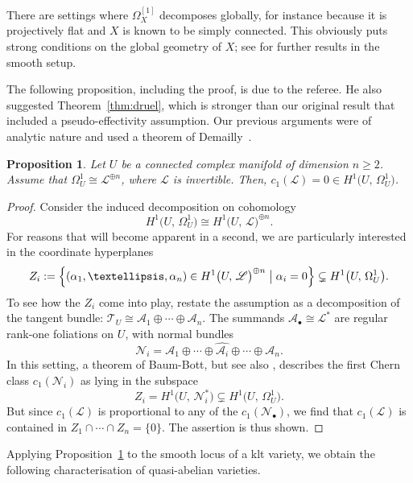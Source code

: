 \documentclass[11pt]{article}
\let\scr\mathscr
\newcommand{\sbullet}{{\scriptscriptstyle\bullet}}
\theoremstyle{plain}
\newtheorem{prop}[thm]{Proposition}
\theoremstyle{definition}
\numberwithin{equation}{thm}
\numberwithin{enumi}{thm}
\newcommand{\sA}{\scr{A}}
\newcommand{\sL}{\scr{L}}
\newcommand{\sN}{\scr{N}}
\newcommand{\sT}{\scr{T}}
\let\what\widehat
\begin{document}
There are settings where $\Omega^{[1]}_X$ decomposes globally, for instance because
it is projectively flat and $X$ is known to be simply connected. This obviously
puts strong conditions on the global geometry of $X$; see \cite{MR1758581} for
further results in the smooth setup.

The following proposition, including the proof, is due to the referee. He also
suggested Theorem~\ref{thm:druel}, which is stronger than our original result
that included a pseudo-effectivity assumption. Our previous arguments were of
analytic nature and used a theorem of Demailly~\cite{Dem02}.

\begin{prop}\label{prop:druel}
Let $U$ be a connected complex manifold of dimension $n \geq 2$. Assume that
$\Omega^1_U \cong \sL^{\oplus n}$, where $\sL$ is invertible. Then,
$c_1(\sL) = 0 \in H^1 \bigl(U,\, \Omega^1_U \bigr)$.
\end{prop}
\begin{proof}
Consider the induced decomposition on cohomology
\[
H^1 \bigl(U,\, \Omega^1_U\bigr) \cong H^1\bigl(U,\, \sL \bigr)^{\oplus n}.
\]
For reasons that
will become apparent in a second, we are particularly interested in the
coordinate hyperplanes
\[
Z_i := \left\{ (\alpha_1, \dots, \alpha_n) \in H^1\bigl(U,\, \sL \bigr)^{\oplus n} \bigm| \alpha_i = 0
\right\} \subsetneq H^1 \bigl(U,\, \Omega^1_U \bigr).
\]
To see how the $Z_i$ come into play, restate the assumption as a decomposition
of the tangent bundle: $\sT_U \cong \sA_1 \oplus \cdots \oplus \sA_n$. The summands $\sA_\sbullet \cong \sL^*$ are
regular rank-one foliations on $U$, with normal bundles
\[
\sN_i = \sA_1 \oplus \cdots \oplus \what{\sA_i} \oplus \cdots \oplus \sA_n.
\]
In this setting, a theorem of Baum-Bott, \cite[Prop.\,3.3 \&
Cor.~3.4]{MR0261635} but see also \cite[Lem.\,3.1]{MR1760872}, describes the
first Chern class $c_1(\sN_i)$ as lying in the subspace
\[
Z_i = H^1 \bigl(U,\, \sN_i^* \bigr) \subsetneq H^1 \bigl(U,\, \Omega^1_U \bigr).
\]
But since $c_1(\sL)$ is proportional to any of the $c_1(\sN_\sbullet)$, we find that
$c_1(\sL)$ is contained in $Z_1 \cap\cdots\cap Z_n = \{0\}$. The assertion is thus shown.
\end{proof}

Applying Proposition~\ref{prop:druel} to the smooth locus of a klt variety, we
obtain the following characterisation of quasi-abelian varieties.
\end{document}
